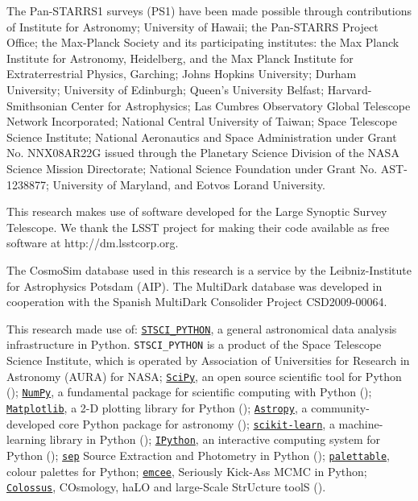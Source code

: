 \documentclass[fleqn,usenatbib,useAMS]{mnras}
\begin{document}
\begin{CJK*}{UTF8}{gbsn}
  The Pan-STARRS1 surveys (PS1) have been made possible through contributions of
  Institute for Astronomy; University of Hawaii; the Pan-STARRS Project Office;
  the Max-Planck Society and its participating institutes: the Max Planck Institute
  for Astronomy, Heidelberg, and the Max Planck Institute for Extraterrestrial Physics,
  Garching; Johns Hopkins University; Durham University; University of Edinburgh;
  Queen's University Belfast; Harvard-Smithsonian Center for Astrophysics; Las
  Cumbres Observatory Global Telescope Network Incorporated; National Central
  University of Taiwan; Space Telescope Science Institute; National Aeronautics
  and Space Administration under Grant No. NNX08AR22G issued through the Planetary
  Science Division of the NASA Science Mission Directorate; National Science
  Foundation under Grant No. AST-1238877; University of Maryland, and Eotvos
  Lorand University.

  This research makes use of software developed for the Large Synoptic Survey
  Telescope. We thank the LSST project for making their code available as free
  software at http://dm.lsstcorp.org.

  The CosmoSim database used in this research is a service by the Leibniz-Institute for
  Astrophysics Potsdam (AIP).
  The MultiDark database was developed in cooperation with the Spanish MultiDark
  Consolider Project CSD2009-00064.

  This research made use of:
  \href{http://www.stsci.edu/institute/software_hardware/pyraf/stsci\_python}{\texttt{STSCI\_PYTHON}},
      a general astronomical data analysis infrastructure in Python.
      \texttt{STSCI\_PYTHON} is a product of the Space Telescope Science Institute,
      which is operated by Association of Universities for Research
      in Astronomy (AURA) for NASA;
  \href{http://www.scipy.org/}{\texttt{SciPy}},
      an open source scientific tool for Python (\citealt{SciPy});
  \href{http://www.numpy.org/}{\texttt{NumPy}},
      a fundamental package for scientific computing with Python (\citealt{NumPy});
  \href{http://matplotlib.org/}{\texttt{Matplotlib}},
      a 2-D plotting library for Python (\citealt{Matplotlib});
  \href{http://www.astropy.org/}{\texttt{Astropy}}, a community-developed
      core Python package for astronomy (\citealt{AstroPy});
  \href{http://scikit-learn.org/stable/index.html}{\texttt{scikit-learn}},
      a machine-learning library in Python (\citealt{scikit-learn});
  \href{https://ipython.org}{\texttt{IPython}},
      an interactive computing system for Python (\citealt{IPython});
  \href{https://github.com/kbarbary/sep}{\texttt{sep}}
      Source Extraction and Photometry in Python (\citealt{PythonSEP});
  \href{https://jiffyclub.github.io/palettable/}{\texttt{palettable}},
      colour palettes for Python;
  \href{http://dan.iel.fm/emcee/current/}{\texttt{emcee}},
      Seriously Kick-Ass MCMC in Python;
  \href{http://bdiemer.bitbucket.org/}{\texttt{Colossus}},
      COsmology, haLO and large-Scale StrUcture toolS (\citealt{Colossus}).


\end{CJK*}
\end{document}
